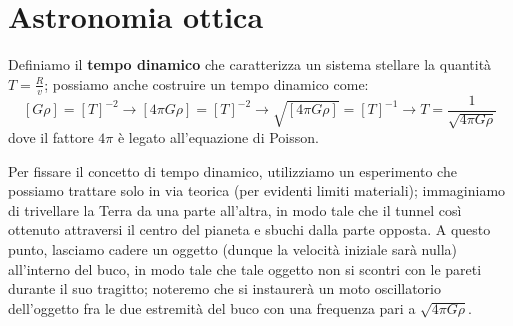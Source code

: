 \section{Astronomia ottica}
Definiamo il \textbf{tempo dinamico} che caratterizza un sistema stellare la quantità $T=\frac{R}{v}$; possiamo anche costruire un tempo dinamico come:
$$\left[G \rho \right]=[T]^{-2} \rightarrow \left[ 4 \pi G \rho \right]=\left[T\right]^{-2} \rightarrow \sqrt{ \left[4 \pi G \rho \right]}=\left[ T \right]^{-1} \rightarrow T=\frac{1}{\sqrt{4 \pi G \rho}}$$
dove il fattore $4 \pi$ è legato all'equazione di Poisson.

Per fissare il concetto di tempo dinamico, utilizziamo un esperimento che possiamo trattare solo in via teorica (per evidenti limiti materiali);  immaginiamo di trivellare la Terra da una parte all'altra, in modo tale che il tunnel così ottenuto attraversi il centro del pianeta e sbuchi dalla parte opposta. A questo punto, lasciamo cadere un oggetto (dunque la velocità iniziale sarà nulla) all'interno del buco, in modo tale che tale oggetto non si scontri con le pareti durante il suo tragitto; noteremo che si instaurerà un moto oscillatorio dell'oggetto fra le due estremità del buco con una frequenza pari a $\sqrt{4 \pi G \rho}$.

